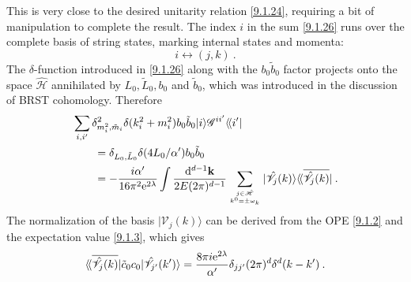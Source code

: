 This is very close to the desired unitarity relation \ref{9.1.24}, requiring a bit of manipulation to complete the result. The index $i$ in the sum \eqref{9.1.26} runs over the complete basis of string states, marking internal states and momenta:
\begin{equation}
	i \leftrightarrow(j, k) \:.
	\label{9.1.27}
\end{equation}
The $\delta$-function introduced in \eqref{9.1.26} along with the $b_{0} \tilde{b}_{0}$ factor projects onto the space $\hat{\mathscr{H}}$ annihilated by $L_{0}, \tilde{L}_{0}, b_{0}$ and $\tilde{b}_{0}$, which was introduced in the discussion of BRST cohomology. Therefore
\begin{align}
	&\sum_{i, i^{\prime}} \delta_{m_{i}^{2}, \tilde{m}_{i}}^{2} \delta(k_{i}^{2}+m_{i}^{2}) b_{0} \tilde{b}_{0}
	|i\rangle \mathscr{G}^{i i^{\prime}}\langle\!\langle i^{\prime}|
	\nonumber  \\
	&\qquad =\delta_{L_{0}, \tilde{L}_{0}} \delta(4 L_{0} / \alpha^{\prime}) b_{0} \tilde{b}_{0}  \nonumber \\
	&\qquad =-\frac{i \alpha^{\prime}}{16 \pi^{2} \mathrm{e}^{2 \lambda}} \int \frac{\mathrm{d}^{d-1} \mathbf{k}}{2 E(2 \pi)^{d-1}} 
	\sum_{j \in \hat{\mathscr{H}} \atop k^{0}=\pm \omega_{k}}
	|\hat{\mathscr{V}}_{j}(k)\rangle \langle\!\langle\overline{\hat{\mathscr{V}}_{j}(k)}|
	\:. \label{9.1.28}
\end{align}
The normalization of the basis $|\mathscr{V}_{j}(k)\rangle$ can be derived from the OPE \eqref{9.1.2} and the expectation value \eqref{9.1.3}, which gives
\begin{equation}
	\langle\!\langle\overline{\hat{\mathscr{V}}_{j}(k)}|\tilde{c}_{0} c_{0}| \hat{\mathscr{V}}_{j^{\prime}}(k^{\prime})\rangle = 
	\frac{8 \pi i \mathrm{e}^{2 \lambda}}{\alpha^{\prime}} \delta_{j j^{\prime}}(2 \pi)^{d} \delta^{d}(k-k^{\prime}) \:. \label{9.1.29}
\end{equation}
